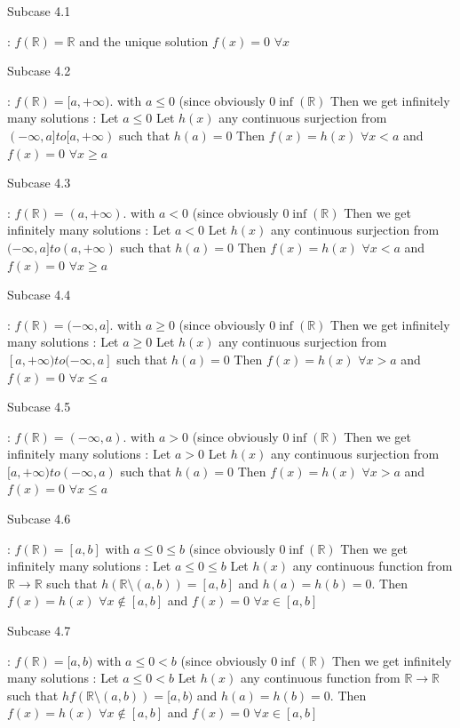 \begin{solution}
\begin{bolded}Subcase 4.1\end{bolded} : $f(\mathbb R)=\mathbb R$ and the unique solution $f(x)=0$ $\forall x$

\begin{bolded}Subcase 4.2\end{bolded} : $f(\mathbb R)=[a,+\infty)$. with $a\le 0$ (since obviously $0\inf(\mathbb R)$
Then we get infinitely many solutions :
Let $a\le 0$
Let $h(x)$ any continuous surjection from $(-\infty,a]to[a,+\infty)$ such that $h(a)=0$
Then $f(x)=h(x)$ $\forall x<a$ and $f(x)=0$ $\forall x\ge a$

\begin{bolded}Subcase 4.3\end{bolded} : $f(\mathbb R)=(a,+\infty)$. with $a< 0$ (since obviously $0\inf(\mathbb R)$
Then we get infinitely many solutions :
Let $a<0$
Let $h(x)$ any continuous surjection from $(-\infty,a]to(a,+\infty)$ such that $h(a)=0$
Then $f(x)=h(x)$ $\forall x<a$ and $f(x)=0$ $\forall x\ge a$

\begin{bolded}Subcase 4.4 \end{bolded}: $f(\mathbb R)=(-\infty,a]$. with $a\ge 0$ (since obviously $0\inf(\mathbb R)$
Then we get infinitely many solutions :
Let $a\ge 0$
Let $h(x)$ any continuous surjection from $[a,+\infty)to(-\infty,a]$ such that $h(a)=0$
Then $f(x)=h(x)$ $\forall x>a$ and $f(x)=0$ $\forall x\le a$

\begin{bolded}Subcase 4.5\end{bolded} : $f(\mathbb R)=(-\infty,a)$. with $a>0$ (since obviously $0\inf(\mathbb R)$
Then we get infinitely many solutions :
Let $a>0$
Let $h(x)$ any continuous surjection from $[a,+\infty)to(-\infty,a)$ such that $h(a)=0$
Then $f(x)=h(x)$ $\forall x>a$ and $f(x)=0$ $\forall x\le a$

\begin{bolded}Subcase 4.6\end{bolded} : $f(\mathbb R)=[a,b]$ with $a\le 0\le b$ (since obviously $0\inf(\mathbb R)$
Then we get infinitely many solutions :
Let $a\le 0\le b$
Let $h(x)$ any continuous function from $\mathbb R\to\mathbb R$ such that $h(\mathbb R\setminus(a,b))=[a,b]$ and $h(a)=h(b)=0$.
Then $f(x)=h(x)$ $\forall x\notin[a,b]$ and $f(x)=0$ $\forall x\in[a,b]$

\begin{bolded}Subcase 4.7\end{bolded} : $f(\mathbb R)=[a,b)$ with $a\le 0< b$ (since obviously $0\inf(\mathbb R)$
Then we get infinitely many solutions :
Let $a\le 0< b$
Let $h(x)$ any continuous function from $\mathbb R\to\mathbb R$ such that $hf(\mathbb R\setminus(a,b))=[a,b)$ and $h(a)=h(b)=0$.
Then $f(x)=h(x)$ $\forall x\notin[a,b]$ and $f(x)=0$ $\forall x\in[a,b]$


\end{solution}
